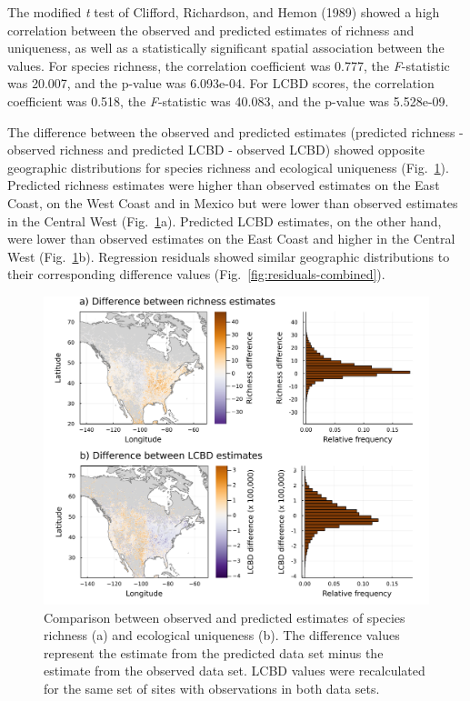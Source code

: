 \documentclass[10pt,oneside]{article}
\makeatletter
\def\maxwidth{\ifdim\Gin@nat@width>\linewidth\linewidth
\else\Gin@nat@width\fi}
\let\Oldincludegraphics\includegraphics
\renewcommand{\includegraphics}[1]{\Oldincludegraphics[width=\maxwidth]{#1}}
\makeatother
\begin{document}
The modified \emph{t} test of Clifford, Richardson, and Hemon (1989)
showed a high correlation between the observed and predicted estimates
of richness and uniqueness, as well as a statistically significant
spatial association between the values. For species richness, the
correlation coefficient was 0.777, the \emph{F}-statistic was 20.007,
and the p-value was 6.093e-04. For LCBD scores, the correlation
coefficient was 0.518, the \emph{F}-statistic was 40.083, and the
p-value was 5.528e-09.

The difference between the observed and predicted estimates (predicted
richness - observed richness and predicted LCBD - observed LCBD) showed
opposite geographic distributions for species richness and ecological
uniqueness (Fig.~\ref{fig:comparison-combined}). Predicted richness
estimates were higher than observed estimates on the East Coast, on the
West Coast and in Mexico but were lower than observed estimates in the
Central West (Fig.~\ref{fig:comparison-combined}a). Predicted LCBD
estimates, on the other hand, were lower than observed estimates on the
East Coast and higher in the Central West
(Fig.~\ref{fig:comparison-combined}b). Regression residuals showed
similar geographic distributions to their corresponding difference
values (Fig.~\ref{fig:residuals-combined}).

\begin{figure}
\hypertarget{fig:comparison-combined}{%
\centering
\includegraphics{figures/comparison-difference.png}
\caption{Comparison between observed and predicted estimates of species
richness (a) and ecological uniqueness (b). The difference values
represent the estimate from the predicted data set minus the estimate
from the observed data set. LCBD values were recalculated for the same
set of sites with observations in both data
sets.}\label{fig:comparison-combined}
}
\end{figure}
\end{document}
